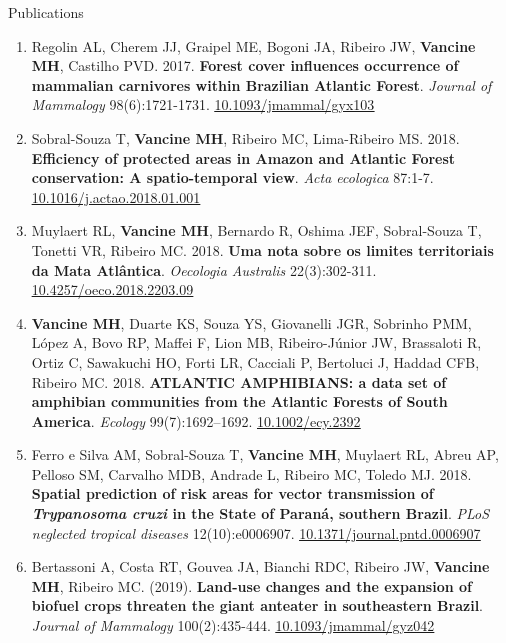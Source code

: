 \documentclass{resume}
\begin{document}
\begin{rSection}{Publications}
\begin{enumerate}
\item Regolin AL, Cherem JJ, Graipel ME, Bogoni JA, Ribeiro JW, {\bf Vancine MH}, Castilho PVD. 2017. {\bf Forest cover influences occurrence of mammalian carnivores within Brazilian Atlantic Forest}. {\it Journal of Mammalogy} 98(6):1721-1731. \href{https://doi.org/10.1093/jmammal/gyx103}{\underline{10.1093/jmammal/gyx103}}

\item Sobral-Souza T, {\bf Vancine MH}, Ribeiro MC, Lima-Ribeiro MS. 2018. {\bf Efficiency of protected areas in Amazon and Atlantic Forest conservation: A spatio-temporal view}. {\it Acta ecologica} 87:1-7. \href{https://doi.org/10.1016/j.actao.2018.01.001}{\underline{10.1016/j.actao.2018.01.001}}

\item Muylaert RL, {\bf Vancine MH}, Bernardo R, Oshima JEF, Sobral-Souza T, Tonetti VR, Ribeiro MC. 2018. {\bf Uma nota sobre os limites territoriais da Mata Atlântica}. {\it Oecologia Australis} 22(3):302-311. \href{https://doi.org/10.4257/oeco.2018.2203.09}{\underline{10.4257/oeco.2018.2203.09}}

\item {\bf Vancine MH}, Duarte KS, Souza YS, Giovanelli JGR, Sobrinho PMM, López A, Bovo RP, Maffei F, Lion MB, Ribeiro-Júnior JW, Brassaloti R, Ortiz C, Sawakuchi HO, Forti LR, Cacciali P, Bertoluci J, Haddad CFB, Ribeiro MC. 2018. {\bf ATLANTIC AMPHIBIANS: a data set of amphibian communities from the Atlantic Forests of South America}. {\it Ecology} 99(7):1692–1692. \href{https://doi.org/10.1002/ecy.2392}{\underline{10.1002/ecy.2392}}

\item Ferro e Silva AM, Sobral-Souza T, {\bf Vancine MH}, Muylaert RL, Abreu AP, Pelloso SM, Carvalho MDB, Andrade L, Ribeiro MC, Toledo MJ. 2018. {\bf Spatial prediction of risk areas for vector transmission of \textbf{\textit{Trypanosoma cruzi}} in the State of Paraná, southern Brazil}. {\it PLoS neglected tropical diseases} 12(10):e0006907. \href{https://doi.org/10.1371/journal.pntd.0006907}{\underline{10.1371/journal.pntd.0006907}}

\item Bertassoni A, Costa RT, Gouvea JA, Bianchi RDC, Ribeiro JW, {\bf Vancine MH}, Ribeiro MC. (2019). {\bf Land-use changes and the expansion of biofuel crops threaten the giant anteater in southeastern Brazil}. {\it Journal of Mammalogy} 100(2):435-444. \href{https://doi.org/10.1093/jmammal/gyz042}{\underline{10.1093/jmammal/gyz042}}


\end{enumerate}
\end{rSection}
\end{document}
